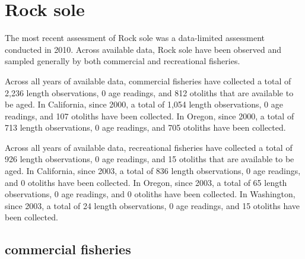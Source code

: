 \documentclass[11pt,
  english,
  letterpaper,
]{article}
\begin{document}
\hypertarget{rock-sole}{%
\section{Rock sole}\label{rock-sole}}

\leavevmode\tagmcend\tagstructend


The most recent assessment of Rock sole was a data-limited assessment conducted in 2010. Across available data, Rock sole have been observed and sampled generally by both commercial and recreational fisheries.

\leavevmode\tagmcend\tagstructend\par


Across all years of available data, commercial fisheries have collected a total of 2,236 length observations, 0 age readings, and 812 otoliths that are available to be aged. In California, since 2000, a total of 1,054 length observations, 0 age readings, and 107 otoliths have been collected. In Oregon, since 2000, a total of 713 length observations, 0 age readings, and 705 otoliths have been collected.

\leavevmode\tagmcend\tagstructend\par


Across all years of available data, recreational fisheries have collected a total of 926 length observations, 0 age readings, and 15 otoliths that are available to be aged. In California, since 2003, a total of 836 length observations, 0 age readings, and 0 otoliths have been collected. In Oregon, since 2003, a total of 65 length observations, 0 age readings, and 0 otoliths have been collected. In Washington, since 2003, a total of 24 length observations, 0 age readings, and 15 otoliths have been collected.

\leavevmode\tagmcend\tagstructend\par


\hypertarget{commercial-fisheries-40}{%
\subsection{commercial fisheries}\label{commercial-fisheries-40}}

\leavevmode\tagmcend\tagstructend
\end{document}
